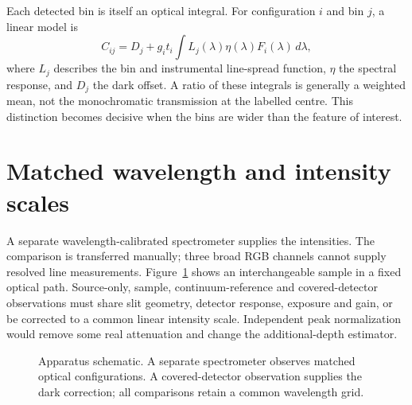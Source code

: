 Each detected bin is itself an optical integral. For configuration $i$ and bin $j$, a linear model is
\begin{equation}
 C_{ij}=D_j+g_it_i\int L_j(\lambda)\eta(\lambda)F_i(\lambda)\,d\lambda,
 \label{eq:spectral-fingerprints-response}
\end{equation}
where $L_j$ describes the bin and instrumental line-spread function, $\eta$ the spectral response, and $D_j$ the dark offset. A ratio of these integrals is generally a weighted mean, not the monochromatic transmission at the labelled centre. This distinction becomes decisive when the bins are wider than the feature of interest.

\section{Matched wavelength and intensity scales}
A separate wavelength-calibrated spectrometer supplies the intensities. The comparison is transferred manually; three broad RGB channels cannot supply resolved line measurements. Figure~\ref{fig:spectral-fingerprints-apparatus} shows an interchangeable sample in a fixed optical path. Source-only, sample, continuum-reference and covered-detector observations must share slit geometry, detector response, exposure and gain, or be corrected to a common linear intensity scale. Independent peak normalization would remove some real attenuation and change the additional-depth estimator.

\begin{figure}[t]
\centering
{}
\caption{Apparatus schematic. A separate spectrometer observes matched optical configurations. A covered-detector observation supplies the dark correction; all comparisons retain a common wavelength grid.}
\label{fig:spectral-fingerprints-apparatus}
\end{figure}

